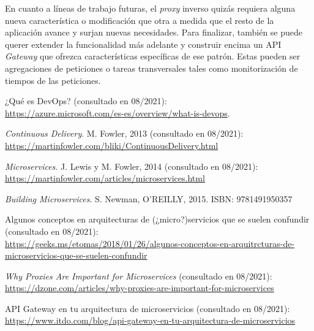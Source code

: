 \documentclass[11pt,spanish,listoffigures]{tfgetsinf}
\begin{document}
En cuanto a líneas de trabajo futuras, el \emph{proxy} inverso quizás requiera alguna nueva característica o modificación que otra a medida que el resto de la aplicación avance y surjan nuevas necesidades. Para finalizar, también se puede querer extender la funcionalidad más adelante y construir encima un API \emph{Gateway} que ofrezca características específicas de ese patrón. Estas pueden ser agregaciones de peticiones o tareas transversales tales como monitorización de tiempos de las peticiones.


\renewcommand{\bibname}{Referencias}

\begin{thebibliography}{10}

¿Qué es DevOps? (consultado en 08/2021):\\
\url{https://azure.microsoft.com/es-es/overview/what-is-devops}.

\emph{Continuous Delivery}.
\newblock M. Fowler, 2013 (consultado en 08/2021):\\
\url{https://martinfowler.com/bliki/ContinuousDelivery.html}

\newblock \emph{Microservices}.
\newblock J. Lewis y M. Fowler, 2014 (consultado en 08/2021):\\
\url{https://martinfowler.com/articles/microservices.html}

\newblock \emph{Building Microservices}.
\newblock S. Newman, O'REILLY, 2015.
\newblock ISBN: 9781491950357

Algunos conceptos en arquitecturas de (¿micro?)servicios que se suelen confundir (consultado en 08/2021):\\
\url{https://geeks.ms/etomas/2018/01/26/algunos-conceptos-en-arquitrcturas-de-microservicios-que-se-suelen-confundir}

\emph{Why Proxies Are Important for Microservices} (consultado en 08/2021):\\
\url{https://dzone.com/articles/why-proxies-are-important-for-microservices}

API Gateway en tu arquitectura de microservicios (consultado en 08/2021):\\
\url{https://www.itdo.com/blog/api-gateway-en-tu-arquitectura-de-microservicios}


\end{thebibliography}
\end{document}
